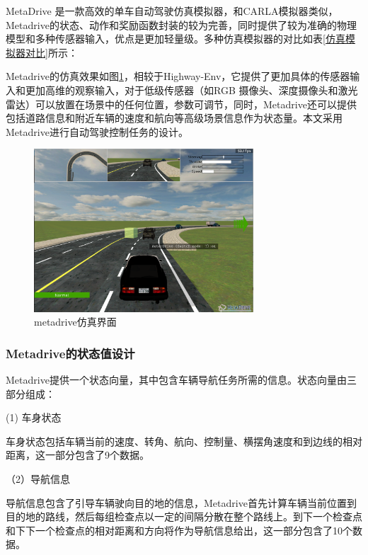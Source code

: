 MetaDrive 是一款高效的单车自动驾驶仿真模拟器\cite{li2021metadrive}，和CARLA模拟器\cite{Dosovitskiy17}类似，Metadrive的状态、动作和奖励函数封装的较为完善，同时提供了较为准确的物理模型和多种传感器输入，优点是更加轻量级。多种仿真模拟器的对比如表\ref{仿真模拟器对比}所示：

Metadrive的仿真效果如图\ref{metadrive}，相较于Highway-Env，它提供了更加具体的传感器输入和更加高维的观察输入，对于低级传感器（如RGB 摄像头、深度摄像头和激光雷达）可以放置在场景中的任何位置，参数可调节，同时，Metadrive还可以提供包括道路信息和附近车辆的速度和航向等高级场景信息作为状态量。本文采用Metadrive进行自动驾驶控制任务的设计。

\begin{figure}[htbp]
    \vspace{13pt} %
    \centering
    \includegraphics[width=0.73\textwidth]{images/chapter3/metadrive.png}%
    \caption{metadrive仿真界面}\label{metadrive} %
\end{figure}  

\subsubsection{Metadrive的状态值设计}

Metadrive提供一个状态向量，其中包含车辆导航任务所需的信息。状态向量由三部分组成：

(1) 车身状态

车身状态包括车辆当前的速度、转角、航向、控制量、横摆角速度和到边线的相对距离，这一部分包含了9个数据。

（2）导航信息

导航信息包含了引导车辆驶向目的地的信息，Metadrive首先计算车辆当前位置到目的地的路线，然后每组检查点以一定的间隔分散在整个路线上。到下一个检查点和下下一个检查点的相对距离和方向将作为导航信息给出，这一部分包含了10个数据。

